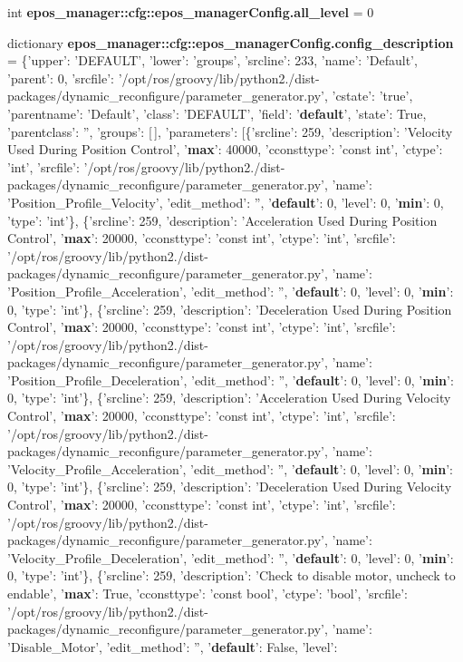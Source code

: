 \begin{DoxyCompactItemize}
\item 
int {\bf epos\-\_\-manager\-::cfg\-::epos\-\_\-manager\-Config.\-all\-\_\-level} = 0
\item 
dictionary {\bf epos\-\_\-manager\-::cfg\-::epos\-\_\-manager\-Config.\-config\-\_\-description} = \{'upper'\-: '\-D\-E\-F\-A\-U\-L\-T', 'lower'\-: 'groups', 'srcline'\-: 233, 'name'\-: '\-Default', 'parent'\-: 0, 'srcfile'\-: '/opt/ros/groovy/lib/python2./dist-\/packages/dynamic\-\_\-reconfigure/parameter\-\_\-generator.\-py', 'cstate'\-: 'true', 'parentname'\-: '\-Default', 'class'\-: '\-D\-E\-F\-A\-U\-L\-T', 'field'\-: '{\bf default}', 'state'\-: \-True, 'parentclass'\-: '', 'groups'\-: [$\,$], 'parameters'\-: [\{'srcline'\-: 259, 'description'\-: '\-Velocity \-Used \-During \-Position \-Control', '{\bf max}'\-: 40000, 'cconsttype'\-: 'const int', 'ctype'\-: 'int', 'srcfile'\-: '/opt/ros/groovy/lib/python2./dist-\/packages/dynamic\-\_\-reconfigure/parameter\-\_\-generator.\-py', 'name'\-: '\-Position\-\_\-\-Profile\-\_\-\-Velocity', 'edit\-\_\-method'\-: '', '{\bf default}'\-: 0, 'level'\-: 0, '{\bf min}'\-: 0, 'type'\-: 'int'\}, \{'srcline'\-: 259, 'description'\-: '\-Acceleration \-Used \-During \-Position \-Control', '{\bf max}'\-: 20000, 'cconsttype'\-: 'const int', 'ctype'\-: 'int', 'srcfile'\-: '/opt/ros/groovy/lib/python2./dist-\/packages/dynamic\-\_\-reconfigure/parameter\-\_\-generator.\-py', 'name'\-: '\-Position\-\_\-\-Profile\-\_\-\-Acceleration', 'edit\-\_\-method'\-: '', '{\bf default}'\-: 0, 'level'\-: 0, '{\bf min}'\-: 0, 'type'\-: 'int'\}, \{'srcline'\-: 259, 'description'\-: '\-Deceleration \-Used \-During \-Position \-Control', '{\bf max}'\-: 20000, 'cconsttype'\-: 'const int', 'ctype'\-: 'int', 'srcfile'\-: '/opt/ros/groovy/lib/python2./dist-\/packages/dynamic\-\_\-reconfigure/parameter\-\_\-generator.\-py', 'name'\-: '\-Position\-\_\-\-Profile\-\_\-\-Deceleration', 'edit\-\_\-method'\-: '', '{\bf default}'\-: 0, 'level'\-: 0, '{\bf min}'\-: 0, 'type'\-: 'int'\}, \{'srcline'\-: 259, 'description'\-: '\-Acceleration \-Used \-During \-Velocity \-Control', '{\bf max}'\-: 20000, 'cconsttype'\-: 'const int', 'ctype'\-: 'int', 'srcfile'\-: '/opt/ros/groovy/lib/python2./dist-\/packages/dynamic\-\_\-reconfigure/parameter\-\_\-generator.\-py', 'name'\-: '\-Velocity\-\_\-\-Profile\-\_\-\-Acceleration', 'edit\-\_\-method'\-: '', '{\bf default}'\-: 0, 'level'\-: 0, '{\bf min}'\-: 0, 'type'\-: 'int'\}, \{'srcline'\-: 259, 'description'\-: '\-Deceleration \-Used \-During \-Velocity \-Control', '{\bf max}'\-: 20000, 'cconsttype'\-: 'const int', 'ctype'\-: 'int', 'srcfile'\-: '/opt/ros/groovy/lib/python2./dist-\/packages/dynamic\-\_\-reconfigure/parameter\-\_\-generator.\-py', 'name'\-: '\-Velocity\-\_\-\-Profile\-\_\-\-Deceleration', 'edit\-\_\-method'\-: '', '{\bf default}'\-: 0, 'level'\-: 0, '{\bf min}'\-: 0, 'type'\-: 'int'\}, \{'srcline'\-: 259, 'description'\-: '\-Check to disable motor, uncheck to endable', '{\bf max}'\-: \-True, 'cconsttype'\-: 'const bool', 'ctype'\-: 'bool', 'srcfile'\-: '/opt/ros/groovy/lib/python2./dist-\/packages/dynamic\-\_\-reconfigure/parameter\-\_\-generator.\-py', 'name'\-: '\-Disable\-\_\-\-Motor', 'edit\-\_\-method'\-: '', '{\bf default}'\-: \-False, 'level'\-: 
\end{DoxyCompactItemize}
